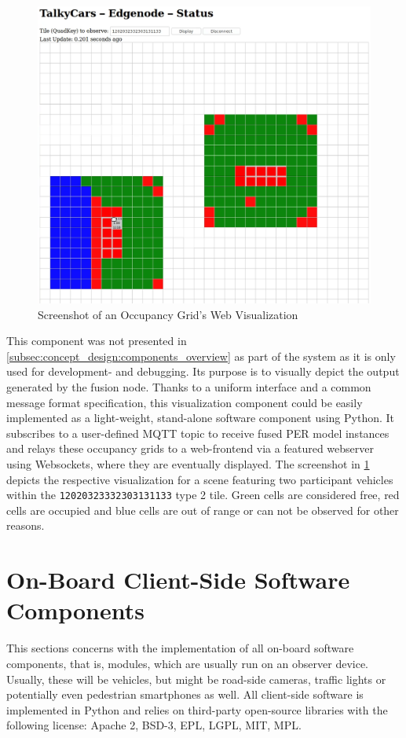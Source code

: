 \begin{figure}[h]
	\centering
	\includegraphics[width=0.8\linewidth]{98_images/screenshot_web_node}
	\caption{Screenshot of an Occupancy Grid's Web Visualization}
	\label{fig:screenshot_web_node}
\end{figure}

This component was not presented in \cref{subsec:concept_design:components_overview} as part of the system as it is only used for development- and debugging. Its purpose is to visually depict the output generated by the fusion node. Thanks to a uniform interface and a common message format specification, this visualization component could be easily implemented as a light-weight, stand-alone software component using Python. It subscribes to a user-defined MQTT topic to receive fused PER model instances and relays these occupancy grids to a web-frontend via a featured webserver using Websockets, where they are eventually displayed. The screenshot in \cref{fig:screenshot_web_node} depicts the respective visualization for a scene featuring two participant vehicles within the \texttt{12020323332303131133} type 2 tile. Green cells are considered free, red cells are occupied and blue cells are out of range or can not be observed for other reasons.

\section{On-Board Client-Side Software Components}
\label{sec:implementation:on_board_client_side_software_components}
This sections concerns with the implementation of all on-board software components, that is, modules, which are usually run on an observer device. Usually, these will be vehicles, but might be road-side cameras, traffic lights or potentially even pedestrian smartphones as well. All client-side software is implemented in Python and relies on third-party open-source libraries with the following license: Apache 2, BSD-3, EPL, LGPL, MIT, MPL. 

